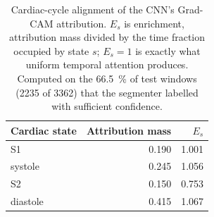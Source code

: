 \begin{table}[t]
\centering
\caption{Cardiac-cycle alignment of the CNN's Grad-CAM attribution. $E_s$ is
enrichment, attribution mass divided by the time fraction occupied by state $s$;
$E_s = 1$ is exactly what uniform temporal attention produces. Computed on the
\SI{66.5}{\percent} of test windows (2235 of 3362) that the segmenter labelled
with sufficient confidence.}
\label{tab:alignment}
\begin{tabular}{lrr}
\toprule
Cardiac state & Attribution mass & $E_s$ \\
\midrule
S1        & 0.190 & 1.001 \\
systole   & 0.245 & 1.056 \\
S2        & 0.150 & 0.753 \\
diastole  & 0.415 & 1.067 \\
\bottomrule
\end{tabular}
\end{table}
